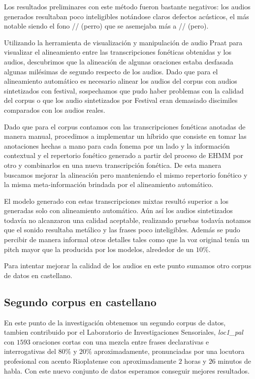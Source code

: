 Los resultados preliminares con este método fueron bastante negativos: los audios generados resultaban poco inteligibles notándose claros defectos acústicos, el más notable siendo el fono // (perro) que se asemejaba más a // (pero).

Utilizando la herramienta de visualización y manipulación de audio Praat \cite{praat} para visualizar el alineamiento entre las transcripciones fonéticas obtenidas y los audios, descubrimos que la alineación de algunas oraciones estaba desfasada algunas milésimas de segundo respecto de los audios. Dado que para el alineamiento automático es necesario alinear los audios del corpus con audios sintetizados con festival, sospechamos que pudo haber problemas con la calidad del corpus o que los audio sintetizados por Festival eran demasiado discimiles comparados con los audios reales. 

Dado que para el corpus contamos con las transcripciones fonéticas anotadas de manera manual, procedimos a implementar un híbrido que consiste en tomar las anotaciones hechas a mano para cada fonema por un lado y la información contextual y el repertorio fonético generado a partir del proceso de EHMM por otro y combinarlos en una nueva transcripción fonética. De esta manera buscamos mejorar la alineación pero manteniendo el mismo repertorio fonético y la misma meta-información brindada por el alineamiento automático.

El modelo generado con estas transcripciones mixtas resultó superior a los generadas solo con alineamiento automático. Aún así los audios sintetizados todavía no alcanzaron una calidad aceptable, realizando pruebas todavía notamos que el sonido resultaba metálico y las frases poco inteligibles. Además se pudo percibir de manera informal otros detalles tales como que la voz original tenía un pitch mayor que la producida por los modelos, alrededor de un $10\%$.

Para intentar mejorar la calidad de los audios en este punto sumamos otro corpus de datos en castellano.

\subsection{Segundo corpus en castellano}

En este punto de la investigación obtenemos un segundo corpus de datos, tambien contribuido por el Laboratorio de Investigaciones Sensoriales, \textit{loc1\_pal} \cite{loc1pal} con $1593$ oraciones cortas con una mezcla entre frases declarativas e interrogativas del $80\%$ y $20\%$ aproximadamente, pronunciadas por una locutora profesional con acento Rioplatense con aproximadamente $2$ horas y $26$ minutos de habla. Con este nuevo conjunto de datos esperamos conseguir mejores resultados.

